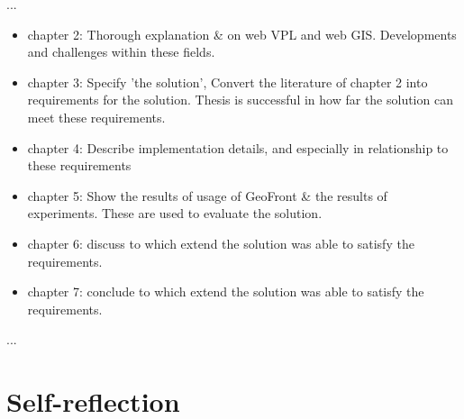...
\begin{itemize}[\m{->}]
  \item chapter 2: Thorough explanation \& on web VPL and web GIS. 
  \subitem Developments and challenges within these fields.
  \item chapter 3: Specify 'the solution', Convert the literature of chapter 2 into requirements for the solution. 
  \subitem Thesis is successful in how far the solution can meet these requirements. 
  \item chapter 4: Describe implementation details, and especially in relationship to these requirements
  \item chapter 5: Show the results of usage of GeoFront \& the results of experiments.
  \subitem These are used to evaluate the solution.
  \item chapter 6: discuss to which extend the solution was able to satisfy the requirements.
  \item chapter 7: conclude to which extend the solution was able to satisfy the requirements.
\end{itemize}

...



\section{Self-reflection} 
